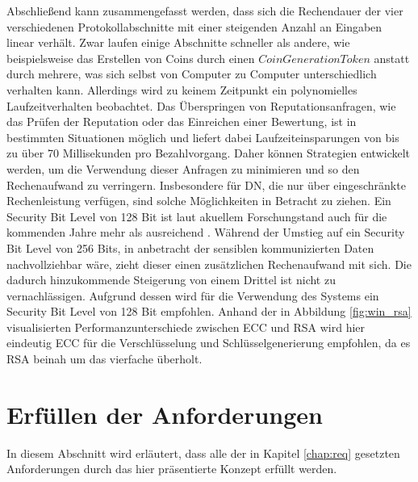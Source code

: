 \documentclass[
	fontsize=11pt,
	headings=small,
	parskip=half,           %
	bibliography=totoc,
	numbers=noenddot,       %
	open=any,               %
]{scrreprt}
\begin{document}
Abschließend kann zusammengefasst werden, dass sich die Rechendauer der vier verschiedenen Protokollabschnitte mit einer steigenden Anzahl an Eingaben linear verhält. Zwar laufen einige Abschnitte schneller als andere, wie beispielsweise das Erstellen von Coins durch einen $CoinGenerationToken$ anstatt durch mehrere, was sich selbst von Computer zu Computer unterschiedlich verhalten kann. Allerdings wird zu keinem Zeitpunkt ein polynomielles Laufzeitverhalten beobachtet. Das Überspringen von Reputationsanfragen, wie das Prüfen der Reputation oder das Einreichen einer Bewertung, ist in bestimmten Situationen möglich und liefert dabei Laufzeiteinsparungen von bis zu über 70 Millisekunden pro Bezahlvorgang. Daher können Strategien entwickelt werden, um die Verwendung dieser Anfragen zu minimieren und so den Rechenaufwand zu verringern. Insbesondere für DN, die nur über eingeschränkte Rechenleistung verfügen, sind solche Möglichkeiten in Betracht zu ziehen. Ein Security Bit Level von 128 Bit ist laut akuellem Forschungstand auch für die kommenden Jahre mehr als ausreichend \cite{elaine2016recommendation,bsi2020cryptographic}. Während der Umstieg auf ein Security Bit Level von 256 Bits, in anbetracht der sensiblen kommunizierten Daten nachvollziehbar wäre, zieht dieser einen zusätzlichen Rechenaufwand mit sich. Die dadurch hinzukommende Steigerung von einem Drittel ist nicht zu vernachlässigen. Aufgrund dessen wird für die Verwendung des Systems ein Security Bit Level von 128 Bit empfohlen. Anhand der in Abbildung \ref{fig:win_rsa} visualisierten Performanzunterschiede zwischen ECC und RSA wird hier eindeutig ECC für die Verschlüsselung und Schlüsselgenerierung empfohlen, da es RSA beinah um das vierfache überholt.

\section{Erfüllen der Anforderungen}
In diesem Abschnitt wird erläutert, dass alle der in Kapitel \ref{chap:req} gesetzten Anforderungen durch das hier präsentierte Konzept erfüllt werden.
\end{document}
